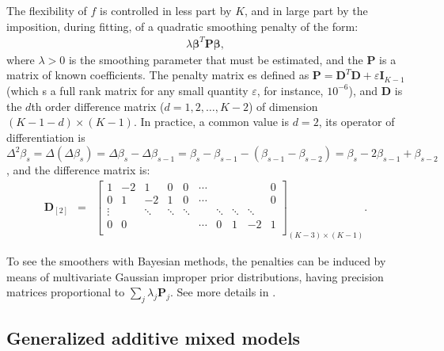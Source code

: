 \documentclass[11pt,letterpaper]{article}
\begin{document}
The flexibility of $f$ is  controlled in less part by $K$, and in large part by the imposition, during fitting, of a quadratic smoothing penalty of the form:  
\begin{eqnarray*} 
\lambda \boldsymbol{\beta}^{T} \boldsymbol{P} \boldsymbol{\beta}  , 
\end{eqnarray*} 
where $\lambda>0$ is the smoothing parameter that must be estimated, and the $\boldsymbol{P}$ is a matrix of known coefficients. 
The penalty matrix es defined as $\boldsymbol{P}=\boldsymbol{D}^{T}\boldsymbol{D}+\varepsilon\boldsymbol{I}_{K-1}$ (which s a full rank matrix for any small quantity $\varepsilon$, for instance, $10^{-6}$), and $\boldsymbol{D}$ is the $d$th order difference matrix ($d=1,2,\ldots,K-2$) of dimension $(K-1-d)\times(K-1)$. In practice, a common value is $d=2$, its operator of differentiation  is  $\Delta^2\beta_s = \Delta(\Delta\beta_s) = \Delta\beta_s-\Delta\beta_{s-1} = \beta_s-\beta_{s-1}-(\beta_{s-1}-\beta_{s-2})  =  \beta_s- 2\beta_{s-1}+\beta_{s-2}$, and  the difference matrix is: 
\begin{eqnarray*}
\boldsymbol{D}_{[2]} &=& 
\left[\begin{array}{cccccccccc} 
1&-2&1&0&0&\cdots&&&&0 \\
0&1&-2&1&0&\cdots&&&&0 \\
\vdots&&\ddots&\ddots&\ddots&&\ddots&\ddots&\ddots& \\
0&0&&&&\cdots&0&1&-2&1 \\
\end{array}\right]_{(K-3)\times(K-1)} .
\end{eqnarray*}





To see the smoothers with Bayesian methods, the penalties can be induced by means of multivariate Gaussian improper prior distributions, having precision matrices proportional to $\sum_{j} \lambda_j \boldsymbol{P}_j$. See more details in \cite{LanBre04}. 


\subsection{Generalized additive mixed models} 
\end{document}

